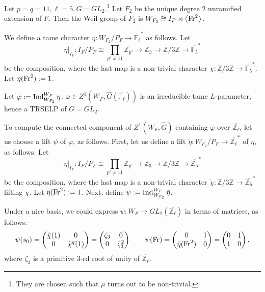 \begin{eg}
	
    Let $p=q=11, \ell=5, G=GL_2$.\footnote{They are chosen such that $\mu$ turns out to be non-trivial.} Let $F_2$ be the unique degree $2$ unramified extension of $F$. Then the Weil group of $F_2$ is $W_{F_2} \cong I_F \rtimes \left<\operatorname{Fr}^2\right>$.
    
    We define a tame character $\eta: W_{F_2}/P_F \to \overline{\mathbb{F}_{\ell}}^*$ as follows. 
    Let 
    $$\eta|_{I_F}: I_F/P_F \cong \prod_{p'\neq 11}\mathbb{Z}_{p'} \to \mathbb{Z}_3 \to \mathbb{Z}/3\mathbb{Z} \to \overline{\mathbb{F}_{5}}^*$$
    be the composition, where the last map is a non-trivial character $\chi: \mathbb{Z}/3\mathbb{Z} \to \overline{\mathbb{F}_{5}}^*$. Let $\eta(\operatorname{Fr}^2):=1$.
    
    Let $\varphi:=\operatorname{\operatorname{Ind}}_{W_{F_2}}^{W_F}\eta$. $\varphi \in Z^1(W_F, \hat{G}(\overline{\mathbb{F}_{\ell}}))$ is an irreducible tame $L$-parameter, hence a TRSELP of $G=GL_2$. 
    
    To compute the connected component of $Z^1(W_F, \hat{G})$ containing $\varphi$ over $\overline{\mathbb{Z}_{\ell}}$, let us choose a lift $\psi$ of $\varphi$, as follows. First, let us define a lift $\tilde{\eta}: W_{F_2}/P_F \to \overline{\mathbb{Z}_{\ell}}^*$ of $\eta$, as follows. Let 
    $$\tilde{\eta}|_{I_F}: I_F/P_F \cong \prod_{p'\neq 11}\mathbb{Z}_{p'} \to \mathbb{Z}_3 \to \mathbb{Z}/3\mathbb{Z} \to \overline{\mathbb{Z}_{5}}^*$$
    be the composition, where the last map is a non-trivial character $\tilde{\chi}: \mathbb{Z}/3\mathbb{Z} \to \overline{\mathbb{Z}_{5}}^*$ lifting $\chi$. Let $\tilde{\eta}(\operatorname{Fr}^2):=1$. Next, define $\psi:=\operatorname{\operatorname{Ind}}_{W_{F_2}}^{W_F}\tilde{\eta}$.
    
    Under a nice basis, we could express $\psi: W_F \to GL_2(\overline{\mathbb{Z}_{\ell}})$ in terms of matrices, as follows:
    $$\psi(s_0)=
    \begin{pmatrix}
    	\tilde{\chi}(1) & 0 \\
    	0 & \tilde{\chi}^q(1) \\
    \end{pmatrix}
    =
    \begin{pmatrix}
    	\zeta_3 & 0 \\
    	0 & \zeta_3^2 \\
    \end{pmatrix}\qquad 
    \psi(\operatorname{Fr})=
    \begin{pmatrix}
    	0 & 1 \\
    	\tilde{\eta}(\operatorname{Fr}^2) & 0 \\
    \end{pmatrix}
    =
    \begin{pmatrix}
    	0 & 1 \\
    	1 & 0 \\
    \end{pmatrix},
    $$
    where $\zeta_3$ is a primitive $3$-rd root of unity of $\overline{\mathbb{Z}_{\ell}}$.
    

\end{eg}
